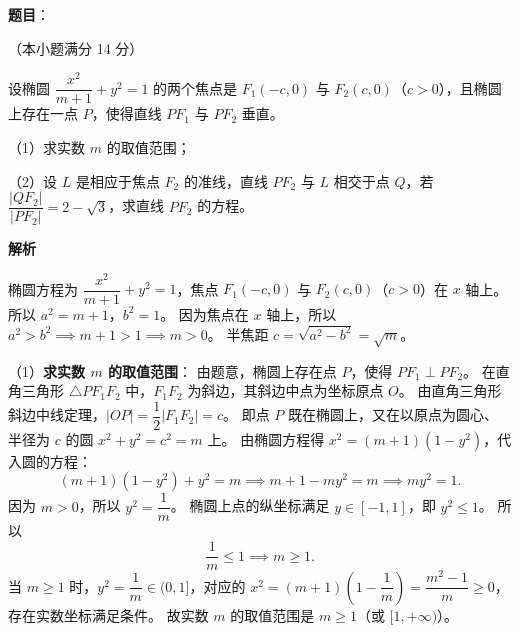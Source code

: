 \begin{answer}

\textbf{题目}：

（本小题满分 14 分）

设椭圆 $\dfrac{x^2}{m+1}+y^2=1$ 的两个焦点是 $F_1(-c,0)$ 与 $F_2(c,0)$（$c>0$），且椭圆上存在一点 $P$，使得直线 $PF_1$ 与 $PF_2$ 垂直。

（1）求实数 $m$ 的取值范围；

（2）设 $L$ 是相应于焦点 $F_2$ 的准线，直线 $PF_2$ 与 $L$ 相交于点 $Q$，若 $\dfrac{|QF_2|}{|PF_2|}=2-\sqrt{3}$，求直线 $PF_2$ 的方程。

\textbf{解析}

椭圆方程为 $\dfrac{x^2}{m+1}+y^2=1$，焦点 $F_1(-c,0)$ 与 $F_2(c,0)$（$c>0$）在 $x$ 轴上。
所以 $a^2=m+1$，$b^2=1$。
因为焦点在 $x$ 轴上，所以 $a^2>b^2 \implies m+1>1 \implies m>0$。
半焦距 $c=\sqrt{a^2-b^2}=\sqrt{m}$。

（1）\textbf{求实数 $m$ 的取值范围}：
由题意，椭圆上存在点 $P$，使得 $PF_1\perp PF_2$。
在直角三角形 $\triangle PF_1F_2$ 中，$F_1F_2$ 为斜边，其斜边中点为坐标原点 $O$。
由直角三角形斜边中线定理，$|OP|=\dfrac{1}{2}|F_1F_2|=c$。
即点 $P$ 既在椭圆上，又在以原点为圆心、半径为 $c$ 的圆 $x^2+y^2=c^2=m$ 上。
由椭圆方程得 $x^2=(m+1)(1-y^2)$，代入圆的方程：
\nopagebreak[4]
\[
(m+1)(1-y^2)+y^2=m \implies m+1-my^2=m \implies my^2=1.
\]
因为 $m>0$，所以 $y^2=\dfrac{1}{m}$。
椭圆上点的纵坐标满足 $y\in[-1,1]$，即 $y^2\leqslant 1$。
所以
\nopagebreak[4]
\[
\frac{1}{m}\leqslant 1 \implies m\geqslant 1.
\]
当 $m\geqslant 1$ 时，$y^2=\dfrac{1}{m}\in(0,1]$，对应的 $x^2=(m+1)\left(1-\dfrac{1}{m}\right)=\dfrac{m^2-1}{m}\geqslant 0$，存在实数坐标满足条件。
故实数 $m$ 的取值范围是 $m\geqslant 1$（或 $[1,+\infty)$）。


\end{answer}
